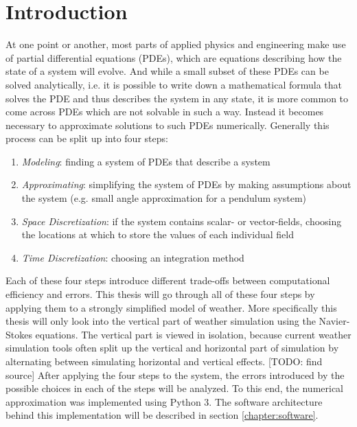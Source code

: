 
\chapter{Introduction}\label{chapter:introduction}

At one point or another, most parts of applied physics and engineering make use of partial differential equations (PDEs), which are equations describing how the state of a system will evolve.
And while a small subset of these PDEs can be solved analytically, i.e. it is possible to write down a mathematical formula that solves the PDE and thus describes the system in any state, it is more common to come across PDEs which are not solvable in such a way.
Instead it becomes necessary to approximate solutions to such PDEs numerically.
Generally this process can be split up into four steps:
\begin{enumerate}
\item \emph{Modeling}: finding a system of PDEs that describe a system
\item \emph{Approximating}: simplifying the system of PDEs by making assumptions about the system (e.g. small angle approximation for a pendulum system)
\item \emph{Space Discretization}: if the system contains scalar- or vector-fields, choosing the locations at which to store the values of each individual field
\item \emph{Time Discretization}: choosing an integration method
\end{enumerate}
Each of these four steps introduce different trade-offs between computational efficiency and errors.
This thesis will go through all of these four steps by applying them to a strongly simplified model of weather.
More specifically this thesis will only look into the vertical part of weather simulation using the Navier-Stokes equations.
The vertical part is viewed in isolation, because current weather simulation tools often split up the vertical and horizontal part of simulation by alternating between simulating horizontal and vertical effects. [TODO: find source]
After applying the four steps to the system, the errors introduced by the possible choices in each of the steps will be analyzed.
To this end, the numerical approximation was implemented using Python 3.
The software architecture behind this implementation will be described in section \ref{chapter:software}.